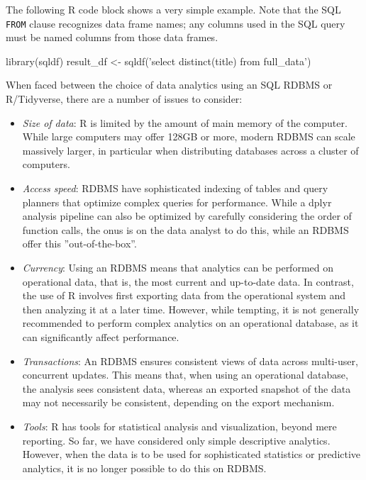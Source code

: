 The following R code block shows a very simple example. Note that the SQL \texttt{FROM} clause recognizes data frame names; any columns used in the SQL query must be named columns from those data frames.

\begin{Rcode}
library(sqldf)
result_df <- sqldf('select distinct(title) from full_data')
\end{Rcode}

When faced between the choice of data analytics using an SQL RDBMS or R/Tidyverse, there are a number of issues to consider:

\begin{itemize}
 \item \emph{Size of data}: R is limited by the amount of main memory of the computer. While large computers may offer 128GB or more, modern RDBMS can scale massively larger, in particular when distributing databases across a cluster of computers.
 \item \emph{Access speed}: RDBMS have sophisticated indexing of tables and query planners that optimize complex queries for performance. While a dplyr analysis pipeline can also be optimized by carefully considering the order of function calls, the onus is on the data analyst to do this, while an RDBMS offer this ''out-of-the-box''.
 \item \emph{Currency}: Using an RDBMS means that analytics can be performed on operational data, that is, the most current and up-to-date data. In contrast, the use of R involves first exporting data from the operational system and then analyzing it at a later time. However, while tempting, it is not generally recommended to perform complex analytics on an operational database, as it can significantly affect performance. 
 \item \emph{Transactions}: An RDBMS ensures consistent views of data across multi-user, concurrent updates. This means that, when using an operational database, the analysis sees consistent data, whereas an exported snapshot of the data may not necessarily be consistent, depending on the export mechanism.
 \item \emph{Tools}: R has tools for statistical analysis and visualization, beyond mere reporting. So far, we have considered only simple descriptive analytics. However, when the data is to be used for sophisticated statistics or predictive analytics, it is no longer possible to do this on RDBMS.
\end{itemize}

